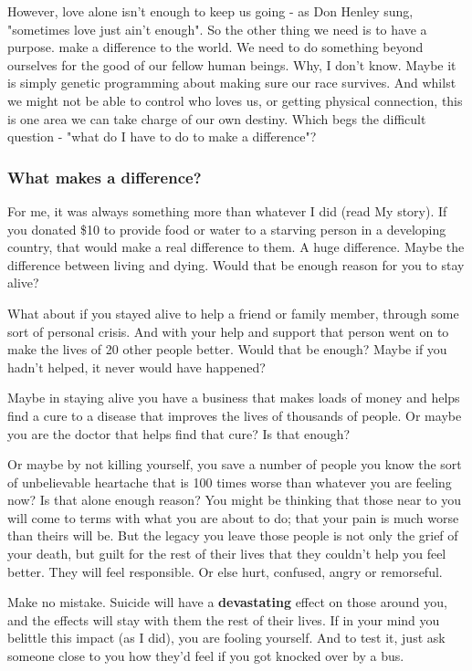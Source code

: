 \documentclass[12pt]{article}
\begin{document}
However, love alone isn't enough to keep us going - as Don Henley sung, "sometimes love just ain't enough". So the other thing we need is to have a purpose. make a difference to the world. We need to do something beyond ourselves for the good of our fellow human beings. Why, I don't know. Maybe it is simply genetic programming about making sure our race survives. And whilst we might not be able to control who loves us, or getting physical connection, this is one area we can take charge of our own destiny. Which begs the difficult question - "what do I have to do to make a difference"?

\subsubsection{What makes a difference?}

For me, it was always something more than whatever I did (read My story). If you donated \$10 to provide food or water to a starving person in a developing country, that would make a real difference to them. A huge difference. Maybe the difference between living and dying. Would that be enough reason for you to stay alive?

What about if you stayed alive to help a friend or family member, through some sort of personal crisis. And with your help and support that person went on to make the lives of 20 other people better. Would that be enough? Maybe if you hadn't helped, it never would have happened?

Maybe in staying alive you have a business that makes loads of money and helps find a cure to a disease that improves the lives of thousands of people. Or maybe you are the doctor that helps find that cure? Is that enough?

Or maybe by not killing yourself, you save a number of people you know the sort of unbelievable heartache that is 100 times worse than whatever you are feeling now? Is that alone enough reason? You might be thinking that those near to you will come to terms with what you are about to do; that your pain is much worse than theirs will be. But the legacy you leave those people is not only the grief of your death, but guilt for the rest of their lives that they couldn't help you feel better. They will feel responsible. Or else hurt, confused, angry or remorseful.

Make no mistake. Suicide will have a \textbf{devastating} effect on those around you, and the effects will stay with them the rest of their lives. If in your mind you belittle this impact (as I did), you are fooling yourself. And to test it, just ask someone close to you how they'd feel if you got knocked over by a bus.
\end{document}
